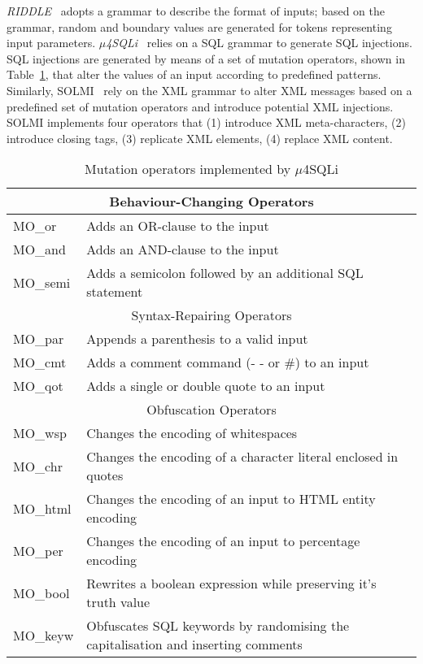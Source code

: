 
\emph{RIDDLE}~\cite{ghosh1998testing} adopts a grammar to describe the format of inputs; based on the grammar, random and boundary values are generated for tokens representing input parameters.
\emph{$\mu$4SQLi}~\cite{Appelt:SQLI:ISSTA:2014} relies on a SQL grammar to generate SQL injections. 
SQL injections are generated by means of a set of mutation operators, shown in Table~\ref{table:Mu4SQLI}, that alter the values of an input according to predefined patterns.
Similarly, SOLMI~\cite{Jan:ISSTA:2016} rely on the XML grammar to alter XML messages based on a predefined set of mutation operators and introduce potential XML injections. 
SOLMI implements four operators that (1) introduce XML meta-characters, (2) introduce closing tags, (3) replicate XML elements, (4) replace XML content.


\begin{table}[h]
\caption{Mutation operators implemented by $\mu$4SQLi}
\label{table:Mu4SQLI}
\begin{tabular}{|p{2cm}|p{11.5cm}|}
\hline
\multicolumn{2}{|c|}{Behaviour-Changing Operators}\\
\hline
MO\_or&Adds an OR-clause to the input\\
MO\_and&Adds an AND-clause to the input\\
MO\_semi&Adds a semicolon followed by an additional SQL statement\\
\hline
\multicolumn{2}{|c|}{Syntax-Repairing Operators}\\
\hline
MO\_par&Appends a parenthesis to a valid input\\
MO\_cmt&Adds a comment command (- - or \#) to an input\\
MO\_qot&Adds a single or double quote to an input\\
\hline
\multicolumn{2}{|c|}{Obfuscation Operators}\\
\hline
MO\_wsp&Changes the encoding of whitespaces \\
MO\_chr&Changes the encoding of a character literal enclosed in quotes\\
MO\_html&Changes the encoding of an input to HTML entity encoding\\
MO\_per&Changes the encoding of an input to percentage encoding\\
MO\_bool&Rewrites a boolean expression while preserving it's truth value\\
MO\_keyw&Obfuscates SQL keywords by randomising the capitalisation and inserting comments\\
\hline
\end{tabular}
\end{table}

